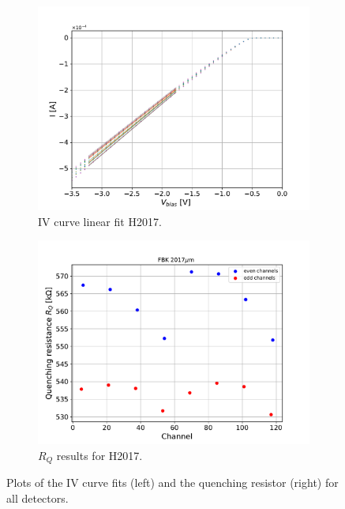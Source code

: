 \begin{figure}[htbp]
\begin{subfigure}{0.48\textwidth}
    \includegraphics[width=\textwidth]{gfx/plots/Rq/H2017/FBK_2017um_IV.pdf}
    \caption{IV curve linear fit H2017.}
    \label{fig:}
  \end{subfigure}
  \hfill
  \begin{subfigure}{0.48\textwidth}
    \includegraphics[width=\textwidth]{gfx/plots/Rq/H2017/FBK_2017um_RQs.pdf}
    \caption{$R_Q$ results for H2017.}
    \label{fig:}
  \end{subfigure}
  \caption{Plots of the IV curve fits (left) and the quenching resistor (right) for all detectors.}
  \label{fig:IV curve linear fit and RQ}
  
\end{figure}


